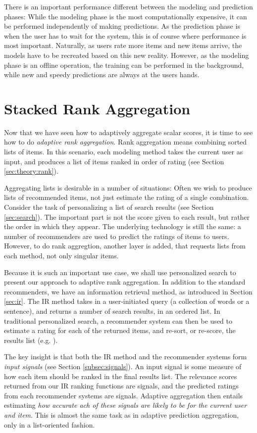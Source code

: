There is an important performance different between the modeling and prediction phases:
While the modeling phase is the most computationally expensive,
it can be performed independently of making predictions.
As the prediction phase is when the user has to wait for the system,
this is of course where performance is most important.
Naturally, as users rate more items and new items arrive,
the models have to be recreated based on this new reality.
However, as the modeling phase is an offline operation,
the training can be performed in the background, while new
and speedy predictions are always at the users hands.


\section{Stacked Rank Aggregation}
\label{sec:methods:rank}

Now that we have seen how to adaptively aggregate scalar scores, it is time to see how
to do \emph{adaptive rank aggregation}. Rank aggregation means combining sorted lists of items.
In this scenario, each modeling method takes the current user as input, and produces a
list of items ranked in order of rating
(see Section \ref{sec:theory:rank}).

Aggregating lists is desirable in a number of situations:
Often we wish to produce lists of recommended items, not just estimate the rating of a single combination.
Consider the task of personalizing a list of search results
(see Section \ref{sec:search}). The important part is not the score
given to each result, but rather the order in which they appear.
The underlying technology is still the same: a number of recommenders are used to predict the ratings
of items to users. However, to do rank aggregtion, another layer is added, that requests lists from each method,
not only singular items.

Because it is such an important use case, we shall use personalized search to present our approach to adaptive rank aggregation.
In addition to the standard recommenders, we have an information retrieval method,
as introduced in Section \ref{sec:ir}.
The IR method takes in a user-initiated query (a collection of words or a sentence), and returns a number of 
search results, in an ordered list.
In traditional personalized search, a recommender system can then be used to estimate a rating for each of the returned items,
and re-sort, or re-score, the results list (e.g. \citet[p3]{Xu2008}).

The key insight is that both the IR method and the recommender systems form \emph{input signals}
(see Section \ref{subsec:signals}).
An input signal is some measure of how each item should be ranked in the final results list.
The relevance scores returned from our IR ranking functions are signals,
and the predicted ratings from each recommender systems are signals.
Adaptive aggregation then entails estimating \emph{how accurate ach of these signals are likely to be for the current user and item}.
This is almost the same task as in adaptive prediction aggregation, only in a list-oriented fashion.

